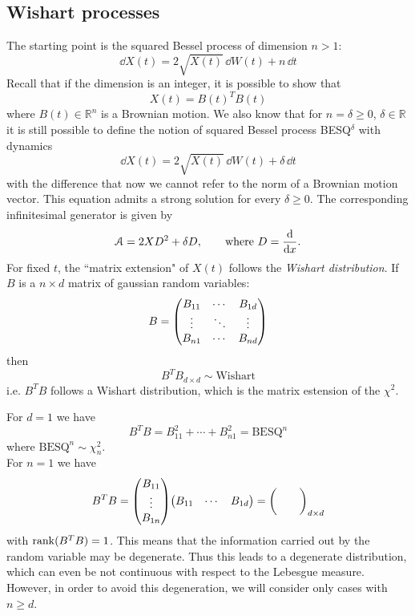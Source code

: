 \subsection{Wishart processes}
The starting point is the squared Bessel process of dimension $n>1$:
\begin{equation*}
    \dd X(t) = 2\sqrt{X(t)}\,\dd W(t) + n\,\dd t
\end{equation*}
Recall that if the dimension is an integer, it is possible to show that
\begin{equation*}
    X(t) = B(t)^TB(t)
\end{equation*}
where $B(t)\in\mathbb{R}^n$ is a Brownian motion. We also know that for $n = \delta \ge 0$, $\delta\in\mathbb{R}$ it is still possible to define the notion of squared Bessel process BESQ$^\delta$ with dynamics
\begin{equation*}
    \dd X(t) = 2\sqrt{X(t)}\,\dd W(t) + \delta\,\dd t
\end{equation*}
with the difference that now we cannot refer to the norm of a Brownian motion vector. This equation admits a strong solution for every $\delta\ge0$. The corresponding infinitesimal generator is given by
\begin{equation*}
    \mathcal{A} = 2XD^2 + \delta D, \qquad \text{where } D = \dv{}{x}.
\end{equation*}
For fixed $t$, the ``matrix extension" of $X(t)$ follows the \emph{Wishart distribution}. If $B$ is a $n\times d$ matrix of gaussian random variables:
\begin{equation}
    B = \mqty(B_{11} & \cdots & B_{1d} \\
              \vdots & \ddots & \vdots \\
              B_{n1} & \cdots & B_{nd})
\end{equation}
then
\begin{equation}
    B^TB_{d\times d} \sim \text{Wishart}
\end{equation}
i.e. $B^TB$ follows a Wishart distribution, which is the matrix estension of the $\chi^2$. \\
\begin{example}{}{}{}
    For $d=1$ we have
    \begin{equation*}
        B^TB = B_{11}^2 + \cdots + B^2_{n1} = \text{BESQ}^n
    \end{equation*}
    where $\text{BESQ}^n \sim \chi^2_n$. \\
    For $n=1$ we have
    \begin{equation*}
        B^TB = \mqty(B_{11} \\ \vdots \\ B_{1n})\mqty(B_{11} & \cdots & B_{1d}) = \mqty( & & \\ & & )_{d\times d}
    \end{equation*}
    with $\rank(B^TB) = 1$. This means that the information carried out by the random variable may be degenerate. Thus this leads to a degenerate distribution, which can even be not continuous with respect to the Lebesgue measure. However, in order to avoid this degeneration, we will consider only cases with $n\ge d$.
\end{example} %
